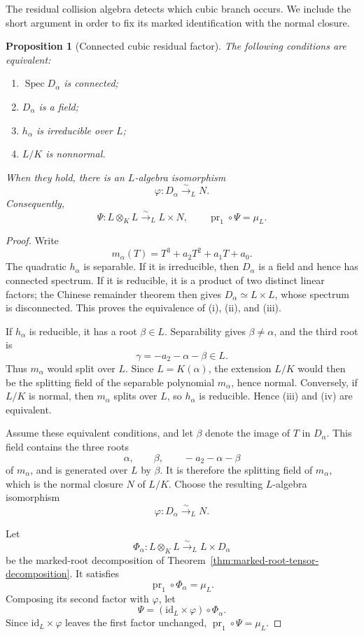 \documentclass[11pt]{article}
\newtheorem{proposition}[theorem]{Proposition}
\theoremstyle{remark}
\theoremstyle{definition}
\DeclareMathOperator{\Spec}{Spec}
\newcommand{\id}{\mathrm{id}}
\begin{document}
The residual collision algebra detects which cubic branch occurs.  We
include the short argument in order to fix its marked identification with
the normal closure.

\begin{proposition}[Connected cubic residual factor]
\label{prop:cubic-tensor-decomposition}
The following conditions are equivalent:
\begin{enumerate}[label=\textup{(\roman*)}]
  \item \(\Spec D_\alpha\) is connected;
  \item \(D_\alpha\) is a field;
  \item \(h_\alpha\) is irreducible over \(L\);
  \item \(L/K\) is nonnormal.
\end{enumerate}
When they hold, there is an \(L\)-algebra isomorphism
\[
  \varphi\colon D_\alpha\xrightarrow{\sim}_L N.
\]
Consequently,
\[
  \Psi\colon L\otimes_KL\xrightarrow{\sim}_L L\times N,
  \qquad
  \operatorname{pr}_1\circ\Psi=\mu_L.
\]
\end{proposition}

\begin{proof}
Write
\[
  m_\alpha(T)=T^3+a_2T^2+a_1T+a_0.
\]
The quadratic \(h_\alpha\) is separable.  If it is irreducible, then
\(D_\alpha\) is a field and hence has connected spectrum.  If it is
reducible, it is a product of two distinct linear factors; the Chinese
remainder theorem then gives \(D_\alpha\simeq L\times L\), whose spectrum
is disconnected.  This proves the equivalence of \textup{(i)},
\textup{(ii)}, and \textup{(iii)}.

If \(h_\alpha\) is reducible, it has a root \(\beta\in L\).
Separability gives \(\beta\neq\alpha\), and the third root is
\[
  \gamma=-a_2-\alpha-\beta\in L.
\]
Thus \(m_\alpha\) would split over \(L\).  Since
\(L=K(\alpha)\), the extension \(L/K\) would then be the splitting
field of the separable polynomial \(m_\alpha\), hence normal.  Conversely,
if \(L/K\) is normal, then \(m_\alpha\) splits over \(L\), so
\(h_\alpha\) is reducible.  Hence \textup{(iii)} and \textup{(iv)} are
equivalent.

Assume these equivalent conditions, and let \(\beta\) denote the image of
\(T\) in \(D_\alpha\).  This field contains the three roots
\[
  \alpha,\qquad \beta,\qquad -a_2-\alpha-\beta
\]
of \(m_\alpha\), and is generated over \(L\) by \(\beta\).  It is
therefore the splitting field of \(m_\alpha\), which is the normal
closure \(N\) of \(L/K\).  Choose the resulting \(L\)-algebra
isomorphism
\[
  \varphi\colon D_\alpha\xrightarrow{\sim}_L N.
\]

Let
\[
  \Phi_\alpha\colon
  L\otimes_KL
  \xrightarrow{\sim}_L
  L\times D_\alpha
\]
be the marked-root decomposition of
Theorem~\ref{thm:marked-root-tensor-decomposition}.  It satisfies
\[
  \operatorname{pr}_1\circ\Phi_\alpha=\mu_L.
\]
Composing its second factor with \(\varphi\), let
\[
  \Psi=(\id_L\times\varphi)\circ\Phi_\alpha.
\]
Since \(\id_L\times\varphi\) leaves the first factor unchanged,
\(\operatorname{pr}_1\circ\Psi=\mu_L\).
\end{proof}
\end{document}
